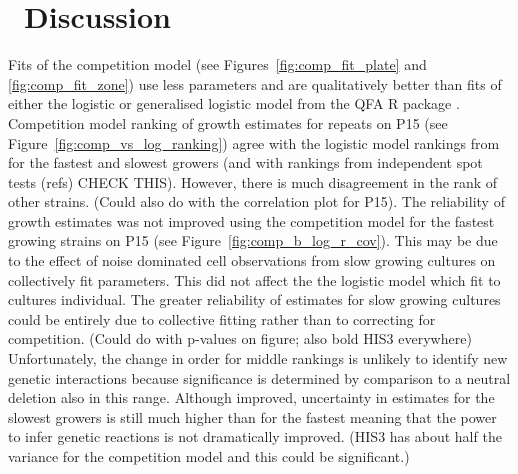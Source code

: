 \graphicspath{{images/}}

\section{\thesection~Discussion}
\label{sec:discussion}

Fits of the competition model (see Figures~\ref{fig:comp_fit_plate}
and \ref{fig:comp_fit_zone}) use less parameters and are qualitatively
better than fits of either the logistic or generalised logistic model
from the QFA R package \citep{Addinall2011,qfa2016}. Competition model
ranking of growth estimates for repeats on P15 (see
Figure~\ref{fig:comp_vs_log_ranking}) agree with the logistic model
rankings from \citet{Addinall2011} for the fastest and slowest growers
(and with rankings from independent spot tests (refs) CHECK
THIS). However, there is much disagreement in the rank of other
strains. (Could also do with the correlation plot for P15). The
reliability of growth estimates was not improved using the competition
model for the fastest growing strains on P15 (see
Figure~\ref{fig:comp_b_log_r_cov}). This may be due to the effect of
noise dominated cell observations from slow growing cultures on
collectively fit parameters. This did not affect the the logistic
model which fit to cultures individual. The greater reliability of
estimates for slow growing cultures could be entirely due to
collective fitting rather than to correcting for competition. (Could
do with p-values on figure; also bold HIS3 everywhere) Unfortunately,
the change in order for middle rankings is unlikely to identify new
genetic interactions because significance is determined by comparison
to a neutral deletion also in this range. Although improved,
uncertainty in estimates for the slowest growers is still much higher
than for the fastest meaning that the power to infer genetic reactions
is not dramatically improved. (HIS3 has about half the variance for
the competition model and this could be
significant.)

